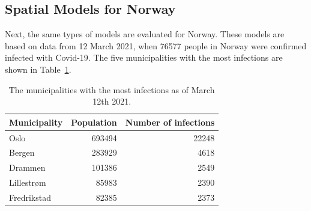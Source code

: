 \subsection{Spatial Models for Norway}
Next, the same types of models are evaluated for Norway. These models are based on data from 12 March 2021, when 76577 people in Norway were confirmed infected with Covid-19. The five municipalities with the most infections are shown in Table~\ref{top5norway}.
\begin{table}[H] 
\caption{The municipalities with the most infections as of March 12th 2021. \label{top5norway}}
\begin{tabular}{l r r}
\toprule
\textbf{Municipality}	& \textbf{Population}	& \textbf{Number of infections} \\
\midrule
Oslo & 693494 & 22248 \\
Bergen & 283929 & 4618 \\
Drammen & 101386 & 2549 \\
Lillestrøm & 85983 & 2390 \\
Fredrikstad & 82385 & 2373 \\
\bottomrule
\end{tabular}
\end{table}
